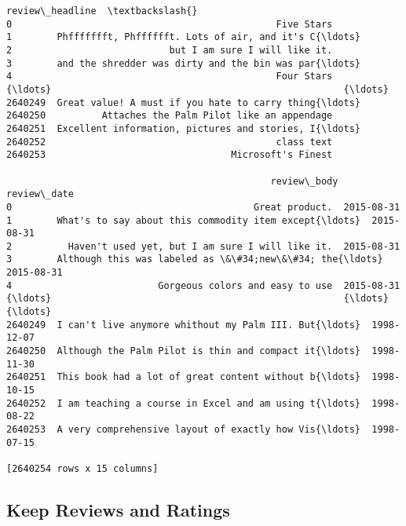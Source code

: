 \documentclass[11pt]{article}
\begin{document}
\begin{Verbatim}[commandchars=\\\{\}]
                                           review\_headline  \textbackslash{}
0                                               Five Stars
1        Phffffffft, Phfffffft. Lots of air, and it's C{\ldots}
2                            but I am sure I will like it.
3        and the shredder was dirty and the bin was par{\ldots}
4                                               Four Stars
{\ldots}                                                    {\ldots}
2640249  Great value! A must if you hate to carry thing{\ldots}
2640250          Attaches the Palm Pilot like an appendage
2640251  Excellent information, pictures and stories, I{\ldots}
2640252                                         class text
2640253                                 Microsoft's Finest

                                               review\_body review\_date
0                                           Great product.  2015-08-31
1        What's to say about this commodity item except{\ldots}  2015-08-31
2          Haven't used yet, but I am sure I will like it.  2015-08-31
3        Although this was labeled as \&\#34;new\&\#34; the{\ldots}  2015-08-31
4                          Gorgeous colors and easy to use  2015-08-31
{\ldots}                                                    {\ldots}         {\ldots}
2640249  I can't live anymore whithout my Palm III. But{\ldots}  1998-12-07
2640250  Although the Palm Pilot is thin and compact it{\ldots}  1998-11-30
2640251  This book had a lot of great content without b{\ldots}  1998-10-15
2640252  I am teaching a course in Excel and am using t{\ldots}  1998-08-22
2640253  A very comprehensive layout of exactly how Vis{\ldots}  1998-07-15

[2640254 rows x 15 columns]
    \end{Verbatim}

    \subsection{Keep Reviews and Ratings}\label{keep-reviews-and-ratings}
\end{document}
